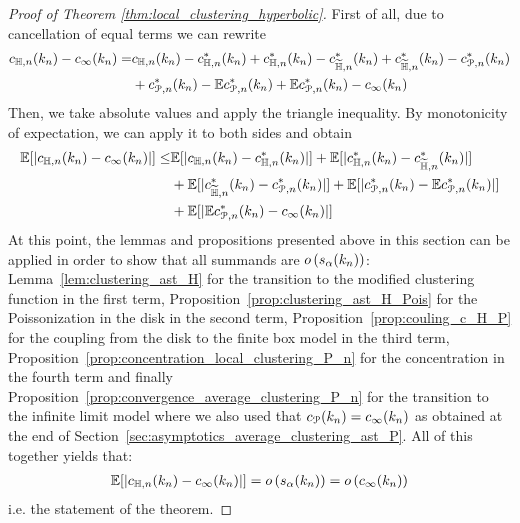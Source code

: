 \begin{proof}[Proof of Theorem \ref{thm:local_clustering_hyperbolic}]
First of all, due to cancellation of equal terms we can rewrite
\begin{align*}
    c_{\mathbb{H},n}(k_n)-c_\infty(k_n) =& c_{\mathbb{H},n}(k_n)-c_{\mathbb{H},n}^\ast(k_n)+c_{\mathbb{H},n}^\ast(k_n)-c_{\widetilde{\mathbb{H}},n}^\ast(k_n)+c_{\widetilde{\mathbb{H}},n}^\ast(k_n)-c_{{\mathcal P},n}^\ast(k_n) \\
    &+c_{{\mathcal P},n}^\ast(k_n)-\mathbb{E} c_{{\mathcal P},n}^\ast(k_n)+\mathbb{E} c_{{\mathcal P},n}^\ast(k_n)-c_\infty(k_n)
\end{align*}
Then, we take absolute values and apply the triangle inequality. By monotonicity of expectation, we can apply it to both sides and obtain
\begin{align*}
    \mathbb{E}[|c_{\mathbb{H},n}(k_n)-c_\infty(k_n)|] \leq & \mathbb{E}[|c_{\mathbb{H},n}(k_n)-c_{\mathbb{H},n}^\ast(k_n)|]+\mathbb{E}[|c_{\mathbb{H},n}^\ast(k_n)-c_{\widetilde{\mathbb{H}},n}^\ast(k_n)|]\\&+\mathbb{E}[|c_{\widetilde{\mathbb{H}},n}^\ast(k_n)-c_{{\mathcal P},n}^\ast(k_n)|] 
    +\mathbb{E}[|c_{{\mathcal P},n}^\ast(k_n)-\mathbb{E} c_{{\mathcal P},n}^\ast(k_n)|]\\&+\mathbb{E}[|\mathbb{E} c_{{\mathcal P},n}^\ast(k_n)-c_\infty(k_n)|]
\end{align*}
At this point, the lemmas and propositions presented above in this section can be applied in order to show that all summands are $o\left(s_\alpha(k_n)\right)$: Lemma~\ref{lem:clustering_ast_H} for the transition to the modified clustering function in the first term, Proposition~\ref{prop:clustering_ast_H_Pois} for the Poissonization in the disk in the second term, Proposition~\ref{prop:couling_c_H_P} for the coupling from the disk to the finite box model in the third term, Proposition~\ref{prop:concentration_local_clustering_P_n} for the concentration in the fourth term and finally Proposition~\ref{prop:convergence_average_clustering_P_n} for the transition to the infinite limit model where we also used that $c_{{\mathcal P}}(k_n) = c_\infty(k_n)$ as obtained at the end of Section~\ref{sec:asymptotics_average_clustering_ast_P}. All of this together yields that:
\begin{align*}
    \mathbb{E}[|c_{\mathbb{H},n}(k_n)-c_\infty(k_n)|] = o\left(s_\alpha(k_n)\right) = o\left(c_\infty(k_n)\right)
\end{align*}
i.e. the statement of the theorem.


\end{proof}
